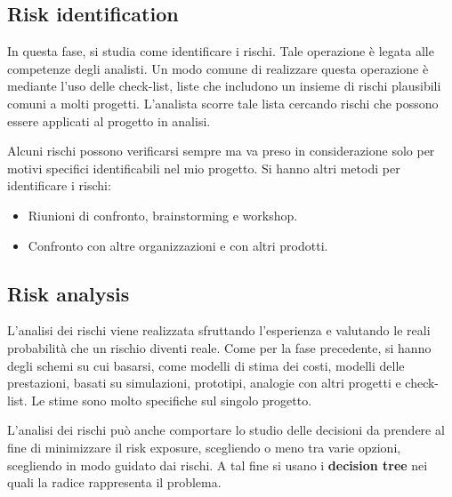\subsection{Risk identification}
In questa fase, si studia come identificare i rischi. Tale operazione è legata
alle competenze degli analisti. Un modo comune di realizzare questa operazione è
mediante l'uso delle check-list, liste che includono un insieme di rischi
plausibili comuni a molti progetti. L'analista scorre tale lista cercando rischi
che possono essere applicati al progetto in analisi.

Alcuni rischi possono verificarsi sempre ma va preso in considerazione solo per
motivi specifici identificabili nel mio progetto. Si hanno altri metodi per
identificare i rischi:
\begin{itemize}
    \item Riunioni di confronto, brainstorming e workshop.
    \item Confronto con altre organizzazioni e con altri prodotti.
\end{itemize}
\subsection{Risk analysis}
L'analisi dei rischi viene realizzata sfruttando l'esperienza e valutando le
reali probabilità che un rischio diventi reale. Come per la fase precedente, si
hanno degli schemi su cui basarsi, come modelli di stima dei costi, modelli delle
prestazioni, basati su simulazioni, prototipi, analogie con altri progetti e
check-list. Le stime sono molto specifiche sul singolo progetto.

L'analisi dei rischi può anche comportare lo studio delle decisioni da prendere
al fine di minimizzare il risk exposure, scegliendo o meno tra varie opzioni,
scegliendo in modo guidato dai rischi. A tal fine si usano i \textbf{decision
    tree} nei quali la radice rappresenta il problema.

